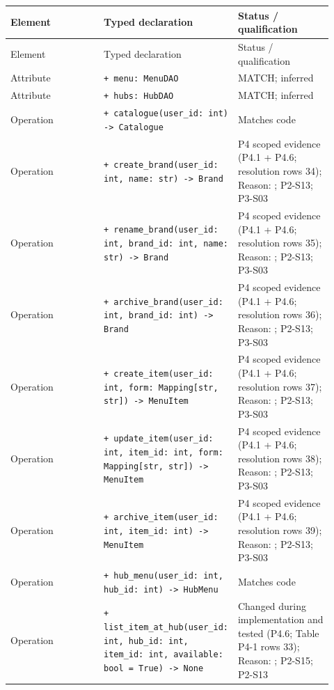 \begin{longtable}{>{\raggedright\arraybackslash}p{0.3067\linewidth}>{\raggedright\arraybackslash}p{0.3067\linewidth}>{\raggedright\arraybackslash}p{0.3067\linewidth}}
Element & Typed declaration & Status / qualification \\
\hline\endfirsthead
Element & Typed declaration & Status / qualification \\
\hline\endhead
Attribute & \texttt{+ menu: MenuDAO} & MATCH; inferred \\
Attribute & \texttt{+ hubs: HubDAO} & MATCH; inferred \\
Operation & \texttt{+ catalogue(user\_\allowbreak{}id: int) -\textgreater{} Catalogue} & Matches code \\
Operation & \texttt{+ create\_\allowbreak{}brand(user\_\allowbreak{}id: int, name: str) -\textgreater{} Brand } & P4 scoped evidence (P4.1 + P4.6; resolution rows 34); Reason: ; P2-S13; P3-S03 \\
Operation & \texttt{+ rename\_\allowbreak{}brand(user\_\allowbreak{}id: int, brand\_\allowbreak{}id: int, name: str) -\textgreater{} Brand } & P4 scoped evidence (P4.1 + P4.6; resolution rows 35); Reason: ; P2-S13; P3-S03 \\
Operation & \texttt{+ archive\_\allowbreak{}brand(user\_\allowbreak{}id: int, brand\_\allowbreak{}id: int) -\textgreater{} Brand } & P4 scoped evidence (P4.1 + P4.6; resolution rows 36); Reason: ; P2-S13; P3-S03 \\
Operation & \texttt{+ create\_\allowbreak{}item(user\_\allowbreak{}id: int, form: Mapping[str, str]) -\textgreater{} MenuItem } & P4 scoped evidence (P4.1 + P4.6; resolution rows 37); Reason: ; P2-S13; P3-S03 \\
Operation & \texttt{+ update\_\allowbreak{}item(user\_\allowbreak{}id: int, item\_\allowbreak{}id: int, form: Mapping[str, str]) -\textgreater{} MenuItem } & P4 scoped evidence (P4.1 + P4.6; resolution rows 38); Reason: ; P2-S13; P3-S03 \\
Operation & \texttt{+ archive\_\allowbreak{}item(user\_\allowbreak{}id: int, item\_\allowbreak{}id: int) -\textgreater{} MenuItem } & P4 scoped evidence (P4.1 + P4.6; resolution rows 39); Reason: ; P2-S13; P3-S03 \\
Operation & \texttt{+ hub\_\allowbreak{}menu(user\_\allowbreak{}id: int, hub\_\allowbreak{}id: int) -\textgreater{} HubMenu} & Matches code \\
Operation & \texttt{+ list\_\allowbreak{}item\_\allowbreak{}at\_\allowbreak{}hub(user\_\allowbreak{}id: int, hub\_\allowbreak{}id: int, item\_\allowbreak{}id: int, available: bool = True) -\textgreater{} None } & Changed during implementation and tested (P4.6; Table P4-1 rows 33); Reason: ; P2-S15; P2-S13 \\

\end{longtable}
